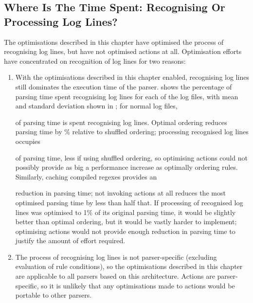 \FloatBarrier{}

\subsection{Where Is The Time Spent: Recognising Or Processing Log Lines?}

\label{recognising vs processing}

The optimisations described in this chapter have optimised the process of
recognising log lines, but have not optimised actions at all.  Optimisation
efforts have concentrated on recognition of log lines for two reasons:

\begin{enumerate}

    \item With the optimisations described in this chapter enabled,
        recognising log lines still dominates the execution time of the
        parser.   shows the percentage of parsing time spent recognising
        log lines for each of the \numberOFlogFILES{} log files, with mean
        and standard deviation shown in ; for normal log files,
        
        of parsing time is spent recognising log lines.  Optimal ordering
        reduces parsing time by
        \%
        relative to shuffled ordering; processing recognised log lines
        occupies
        
        of parsing time, less if using shuffled ordering, so optimising
        actions could not possibly provide as big a performance increase as
        optimally ordering rules.  Similarly, caching compiled regexes
        provides an
        
        reduction in parsing time; not invoking actions at all reduces the
        most optimised parsing time by less than half that.  If processing
        of recognised log lines was optimised to 1\% of its original
        parsing time, it would be slightly better than optimal ordering,
        but it would be vastly harder to implement; optimising actions
        would not provide enough reduction in parsing time to justify the
        amount of effort required.

    \item The process of recognising log lines is not parser-specific
        (excluding evaluation of rule conditions), so the optimisations
        described in this chapter are applicable to all parsers based on
        this architecture.  Actions are parser-specific, so it is unlikely
        that any optimisations made to actions would be portable to other
        parsers.

\end{enumerate}

